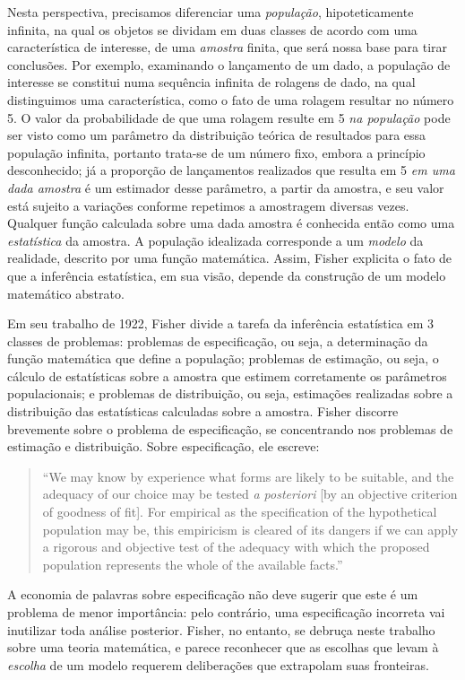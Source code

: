 Nesta perspectiva, precisamos diferenciar uma {\em população}, hipoteticamente infinita, na qual os objetos se dividam em duas
classes de acordo com uma característica de interesse, de uma {\em amostra} finita, que será nossa base para tirar conclusões.
Por exemplo, examinando o lançamento de um dado, a população de interesse se constitui numa sequência infinita de rolagens
de dado, na qual distinguimos uma característica, como o fato de uma rolagem resultar no número 5. O valor da probabilidade de que
uma rolagem resulte em 5 {\em na população} pode ser visto como um parâmetro da distribuição teórica de resultados para essa
população infinita, portanto trata-se de um número fixo, embora a princípio desconhecido; 
já a proporção de lançamentos realizados que resulta em 5 {\em em uma dada amostra} é um estimador desse parâmetro,
a partir da amostra, e seu valor está sujeito a variações conforme repetimos a amostragem diversas vezes.
Qualquer função calculada sobre uma dada amostra é conhecida então como uma {\em estatística} da amostra.
A população idealizada corresponde a um {\em modelo} da realidade, descrito por uma função matemática.
Assim, Fisher explicita o fato de que a inferência estatística, em sua visão, depende da construção de um modelo matemático
abstrato.

Em seu trabalho de 1922, Fisher divide a tarefa da inferência estatística em 3 classes de 
problemas: problemas de especificação, ou seja, a determinação da função
matemática que define a população; problemas de estimação, ou seja, o cálculo de estatísticas sobre a amostra que estimem 
corretamente os parâmetros populacionais; e problemas de distribuição, ou seja, estimações realizadas sobre a distribuição
das estatísticas calculadas sobre a amostra. Fisher discorre brevemente sobre o problema de especificação,
se concentrando nos problemas de estimação e distribuição. Sobre especificação, ele escreve:

\begin{quote}
``We may know by experience what forms are likely to be suitable, and the adequacy of our choice may be
tested {\em a posteriori} [by an objective criterion of goodness of fit].
For empirical as the specification of the hypothetical population may be, this empiricism is cleared of its dangers if
we can apply a rigorous and objective test of the adequacy with which the proposed population represents the whole of
the available facts.''\citep{Fisher1922}
\end{quote}

A economia de palavras sobre especificação não deve sugerir que este é um problema de menor importância: pelo contrário,
uma especificação incorreta vai inutilizar toda análise posterior. Fisher, no entanto, se debruça neste trabalho sobre
uma teoria matemática, e parece reconhecer que as escolhas que levam à {\em escolha} de um modelo requerem deliberações
que extrapolam suas fronteiras.

